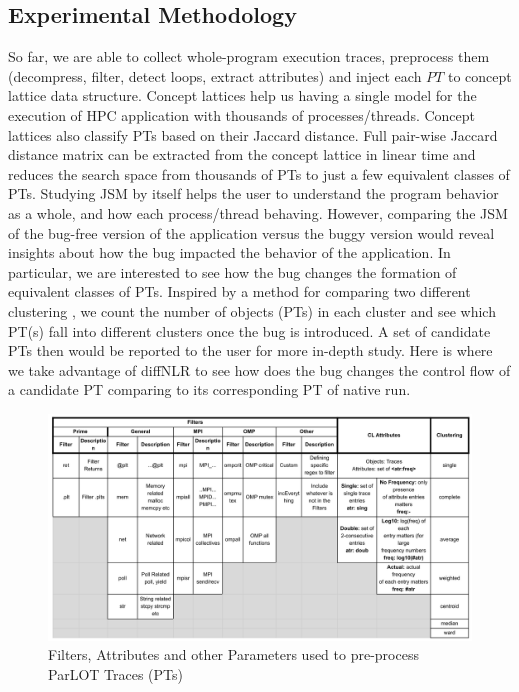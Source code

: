 \subsection{Experimental Methodology}
So far, we are able to collect whole-program execution traces, preprocess them (decompress, filter, detect loops, extract attributes) and inject each $PT$ to concept lattice data structure.
%
Concept lattices help us having a single model for the execution of HPC application with thousands of processes/threads.
%
Concept lattices also classify PTs based on their Jaccard distance.
%
Full pair-wise Jaccard distance matrix can be extracted from the concept lattice in linear time and reduces the search space from thousands of PTs to just a few equivalent classes of PTs.
%
Studying JSM by itself helps the user to understand the program behavior as a whole, and how each process/thread behaving.
%
However, comparing the JSM of the bug-free version of the application versus the buggy version would reveal insights about how the bug impacted the behavior of the application.
%
In particular, we are interested to see how the bug changes the formation of equivalent classes of PTs.
%
Inspired by a method for comparing two different clustering \cite{fowlkes83}, we count the number of objects (PTs) in each cluster and see which PT(s) fall into different clusters once the bug is introduced.
%
A set of candidate PTs then would be reported to the user for more in-depth study.
%
Here is where we take advantage of diffNLR to see how does the bug changes the control flow of a candidate PT comparing to its corresponding PT of native run.
%

\begin{figure}[t]
\centering
\includegraphics[width=6in]{graphics/parametersTable.png}
\caption{Filters, Attributes and other Parameters used to pre-process ParLOT Traces (PTs)}
\label{tab:parameters}
\end{figure}

